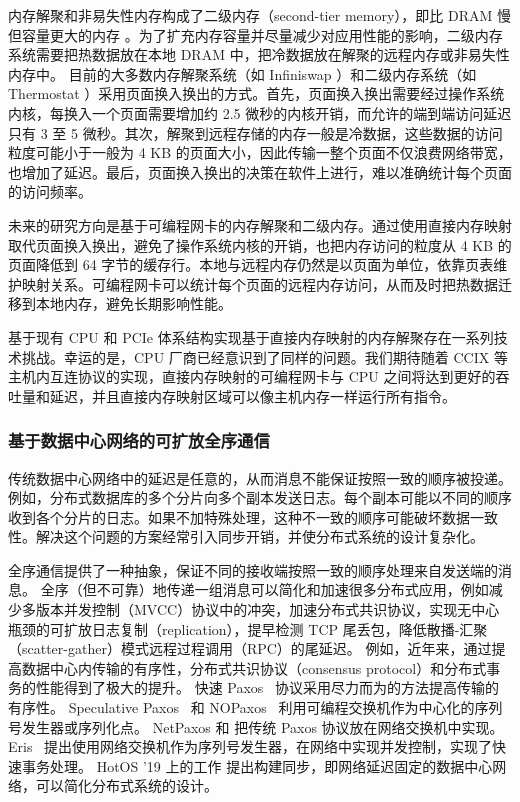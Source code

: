 内存解聚和非易失性内存构成了二级内存（second-tier memory），即比 DRAM 慢但容量更大的内存 \cite{dulloor2016data}。为了扩充内存容量并尽量减少对应用性能的影响，二级内存系统需要把热数据放在本地 DRAM 中，把冷数据放在解聚的远程内存或非易失性内存中。
目前的大多数内存解聚系统（如 Infiniswap \cite{gu2017efficient}）和二级内存系统（如 Thermostat \cite{agarwal2017thermostat}）采用页面换入换出的方式。首先，页面换入换出需要经过操作系统内核，每换入一个页面需要增加约 2.5 微秒的内核开销，而允许的端到端访问延迟只有 3 至 5 微秒。其次，解聚到远程存储的内存一般是冷数据，这些数据的访问粒度可能小于一般为 4 KB 的页面大小，因此传输一整个页面不仅浪费网络带宽，也增加了延迟。最后，页面换入换出的决策在软件上进行，难以准确统计每个页面的访问频率。

未来的研究方向是基于可编程网卡的内存解聚和二级内存。通过使用直接内存映射取代页面换入换出，避免了操作系统内核的开销，也把内存访问的粒度从 4 KB 的页面降低到 64 字节的缓存行。本地与远程内存仍然是以页面为单位，依靠页表维护映射关系。可编程网卡可以统计每个页面的远程内存访问，从而及时把热数据迁移到本地内存，避免长期影响性能。

基于现有 CPU 和 PCIe 体系结构实现基于直接内存映射的内存解聚存在一系列技术挑战。幸运的是，CPU 厂商已经意识到了同样的问题。我们期待随着 CCIX 等主机内互连协议的实现，直接内存映射的可编程网卡与 CPU 之间将达到更好的吞吐量和延迟，并且直接内存映射区域可以像主机内存一样运行所有指令。


\subsubsection{基于数据中心网络的可扩放全序通信}
\label{future:system-network-codesign}



传统数据中心网络中的延迟是任意的，从而消息不能保证按照一致的顺序被投递。例如，分布式数据库的多个分片向多个副本发送日志。每个副本可能以不同的顺序收到各个分片的日志。如果不加特殊处理，这种不一致的顺序可能破坏数据一致性。解决这个问题的方案经常引入同步开销，并使分布式系统的设计复杂化。

全序通信提供了一种抽象，保证不同的接收端按照一致的顺序处理来自发送端的消息。
全序（但不可靠）地传递一组消息可以简化和加速很多分布式应用，例如减少多版本并发控制（MVCC）协议中的冲突，加速分布式共识协议，实现无中心瓶颈的可扩放日志复制（replication），提早检测 TCP 尾丢包，降低散播-汇聚（scatter-gather）模式远程过程调用（RPC）的尾延迟。
例如，近年来，通过提高数据中心内传输的有序性，分布式共识协议（consensus protocol）和分布式事务的性能得到了极大的提升。
快速 Paxos~\cite{lamport2006fast,kemme1999processing,moraru2013there,pedone1998optimistic} 协议采用尽力而为的方法提高传输的有序性。
Speculative Paxos~\cite{ports2015designing} 和 NOPaxos~\cite{li2016just} 利用可编程交换机作为中心化的序列号发生器或序列化点。
NetPaxos \cite{dang2015netpaxos,dang2016paxos} 和 \cite{dang2016network} 把传统 Paxos 协议放在网络交换机中实现。
Eris~\cite{eris} 提出使用网络交换机作为序列号发生器，在网络中实现并发控制，实现了快速事务处理。
HotOS '19 上的工作 \cite{synchronous-datacenter} 提出构建同步，即网络延迟固定的数据中心网络，可以简化分布式系统的设计。

